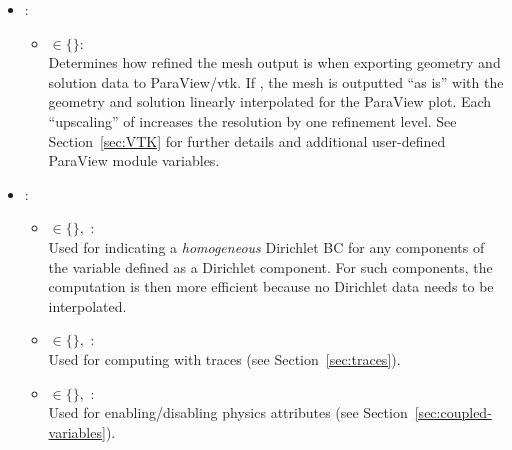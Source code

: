 \begin{itemize}
{\begin{itemize}
{			}
			\item {} $\in \{$$\}$:\\
			The solution component set the user wishes to compute, assemble and solve for (if using ).\footnote{Alternatively, one can use the  routine to transfer solution DOFs from one component set into another.} Currently, only  is supported but this feature will be enabled in a future release.
			\item {} $\in \{$$\}$:\\
			Number of right-hand sides (``loads'') defined for the problem. For each additional load, additional solution variables are allocated and solved for. This parameter may be set at runtime before mesh initialization by calling the  routine. Currently, only  is supported but this feature will be enabled in a future release.
		\end{itemize}
	}
	\item
	{
		 : 
		\begin{itemize}
			\item { $\in \{$$\}$:\\
			Determines how refined the mesh output is when exporting geometry and solution data to ParaView/vtk. If , the mesh is outputted ``as is'' with the geometry and solution linearly interpolated for the ParaView plot. Each ``upscaling'' of  increases the resolution by one refinement level. See Section~\ref{sec:VTK} for further details and additional user-defined ParaView module variables.
			}
		\end{itemize}
	}
	\item
	{
		 :
		\begin{itemize}
			\item{  $\in \{$$\},$ :\\
			Used for indicating a \emph{homogeneous} Dirichlet BC for any components of the variable defined as a Dirichlet component. For such components, the computation is then more efficient because no Dirichlet data needs to be interpolated.
			}
			\item{  $\in \{$$\},$ :\\ 
			Used for computing with traces (see Section~\ref{sec:traces}).
			}
			\item{  $\in \{$$\},$ :\\ 
			Used for enabling/disabling physics attributes (see Section~\ref{sec:coupled-variables}).
			}
		\end{itemize}
	}
\end{itemize}

